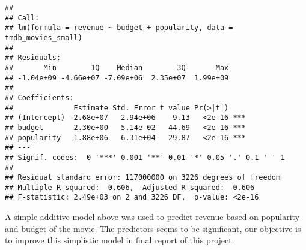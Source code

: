\documentclass[
]{article}
\begin{document}
\begin{verbatim}
## 
## Call:
## lm(formula = revenue ~ budget + popularity, data = tmdb_movies_small)
## 
## Residuals:
##       Min        1Q    Median        3Q       Max 
## -1.04e+09 -4.66e+07 -7.09e+06  2.35e+07  1.99e+09 
## 
## Coefficients:
##              Estimate Std. Error t value Pr(>|t|)    
## (Intercept) -2.68e+07   2.94e+06   -9.13   <2e-16 ***
## budget       2.30e+00   5.14e-02   44.69   <2e-16 ***
## popularity   1.88e+06   6.31e+04   29.87   <2e-16 ***
## ---
## Signif. codes:  0 '***' 0.001 '**' 0.01 '*' 0.05 '.' 0.1 ' ' 1
## 
## Residual standard error: 117000000 on 3226 degrees of freedom
## Multiple R-squared:  0.606,  Adjusted R-squared:  0.606 
## F-statistic: 2.49e+03 on 2 and 3226 DF,  p-value: <2e-16
\end{verbatim}

A simple additive model above was used to predict revenue based on
popularity and budget of the movie. The predictors seems to be
significant, our objective is to improve this simplistic model in final
report of this project.
\end{document}
